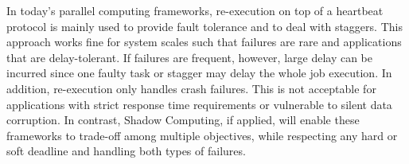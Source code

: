 In today's parallel computing frameworks, re-execution on top of a heartbeat protocol is mainly used to provide fault tolerance and to deal with staggers. This approach works fine for system scales such that failures are rare and applications that are delay-tolerant. If failures are frequent, however, large delay can be incurred since one faulty task or stagger may delay the whole job execution. In addition, re-execution only handles crash failures. This is not acceptable for applications with strict response time requirements or vulnerable to silent data corruption. In contrast, Shadow Computing, if applied, will enable these frameworks to trade-off among multiple objectives, while respecting any hard or soft deadline and handling both types of failures. 

